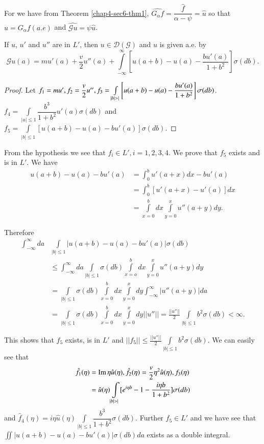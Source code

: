For we have from Theorem \ref{chap4-sec6-thm1}, $\widehat{G_{\alpha} f} =
\dfrac{\hat{f}}{\alpha - \psi} = \hat{u}$ so that $u = G_{\alpha}
f(a. e)$ and $\widehat{\mathscr{G} u} = \psi \hat{u}$. 

\begin{thm}\label{chap4-sec6-thm2}%
  If $u$, $u'$ and $u''$ are in $L'$, then $u \in
  \mathscr{D}(\mathscr{G})$ and $u$ is given a.e. by  
  $$
  \mathscr{G}u(a) = m u' (a) + \frac{v}{2} u''(a) + \int
  \limits^{\infty}_{-\infty} \left[u(a+b) - u(a) - \frac{b u' (a)}{1+b^2}\right]
  \sigma (db). 
  $$
\end{thm}

\begin{proof}
  Let $f_1 = m u' , f_2 = \dfrac{v}{2} u'', f_3 = \int
  \limits_{|b|>|} \left[u(a+b) - u(a) - \dfrac{b u' (a)}{1+b^2}\right]\break \sigma
  (db)$. $f_4 = \int\limits_{|u|\leq 1} \dfrac{b^3}{1+b^2} u' (a) \sigma
  (db) $ and $f_5 = \int\limits_{|b|\leq 1} [u(a+b) - u(a)- b u' (a)]
  \sigma (db)$. 
\end{proof}

From the hypothesis we see that $f_i \in L',i= 1, 2, 3, 4$. We prove
that $f_5$ exists and is in $L'$. We have  
\begin{align*}
u(a+b) - u(a) - b u' (a) & = \int^b_0 u' (a+x) dx - b u' (a)\\ 
&=\int^b_0 [u' (a+x) - u' (a)] dx\\ 
& = \int \limits^b_{x=0} dx \int \limits^x_{y=0} u'' (a+y)dy. 
\end{align*}

Therefore
\begin{align*}
  \int^{\infty}_{-\infty} da & \int \limits_{|b| \leq 1}| u(a+b) - u(a) -
  bu'(a) | \sigma (db)\\ 
  & \leq \int^{\infty}_{-\infty} da \int \limits_{|b|
    \leq 1} \sigma (db) \int \limits^b_{x=o} dx \int \limits_{y=0}^x
  u''(a+y) dy\\ 
  & = \int\limits_{|b| \leq 1} \sigma (db) \int\limits_{x=0}^b dx \int
  \limits_{y=0}^x  dy \int^{\infty}_{-\infty} | u''(a+y) |da\\ 
  & = \int \limits_{|b| \leq 1} \sigma (db) \int \limits_{x=0}^b dx
  \int \limits_{y=0}^x dy ||u''|| = \frac{||u''||}{2} \int
  \limits_{|b| \leq 1} b^2 \sigma (db) < \infty. 
\end{align*}\pageoriginale

This shows that $f_5$ exists, is in $L'$ and $||f_5||\leq
\frac{||u''||}{2} \int \limits_{|b| \leq 1} b^2 \sigma (db)$. We can
easily see that  
\begin{align*}
\hat{f}_1(\eta) &= \Iim \eta \hat{u}(\eta), \hat{f}_2 (\eta) =
  \frac{v}{2} \eta^2 \hat{u}(\eta), f_3 (\eta)\\ 
  &= \hat{u}(\eta) \int
  \limits_{|b|>|}[ e^{i \eta b}-1- \frac{i \eta b}{1+b^2}] \sigma (db) 
\end{align*}
and $\hat{f}_4 (\eta) = i \eta \hat{u}(\eta) \int \limits_{|b|\leq 1}
\dfrac{b^3}{1+ b^2} \sigma(d b)$. Further $f_5 \in L'$ and we have see
that $\iint | u(a+b) -u(a)-bu'(a)| \sigma (db)da$ exists as a double
integral. 

